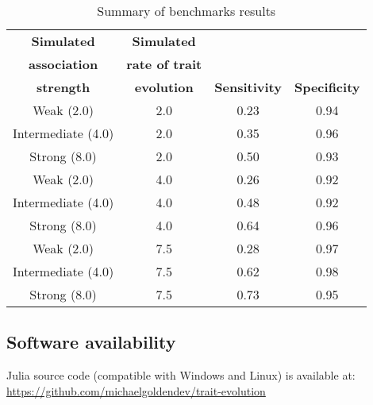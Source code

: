 \documentclass[]{article}
\begin{document}
{
\begin{table}
	\centering
	\caption{\label{tab:results} Summary of benchmarks results}	
	\small
	\begin{tabular}{cccc}
		\midrule
		\textbf{Simulated} & \textbf{Simulated} & & \\
		\textbf{association}  & \textbf{rate of trait} & & \\
		\textbf{strength} & \textbf{evolution} & \textbf{Sensitivity} & \textbf{Specificity}\\
		\midrule
		Weak (2.0) & 2.0 & 0.23 & 0.94\\
		Intermediate (4.0) & 2.0 & 0.35 & 0.96\\
		Strong (8.0) & 2.0 & 0.50 & 0.93\\
		Weak (2.0) & 4.0 & 0.26 & 0.92\\
		Intermediate (4.0) & 4.0 & 0.48 & 0.92\\
		Strong (8.0) & 4.0 & 0.64 & 0.96\\
		Weak (2.0) & 7.5 & 0.28 & 0.97\\
		Intermediate (4.0) & 7.5 & 0.62 & 0.98\\
		Strong (8.0) & 7.5 & 0.73 & 0.95\\
		\midrule
	\end{tabular}
\end{table}
}

\subsection*{Software availability}
Julia source code (compatible with Windows and Linux) is available at:\\ \href{https://github.com/michaelgoldendev/MESSI/trait-evolution}{https://github.com/michaelgoldendev/trait-evolution}

\end{document}

